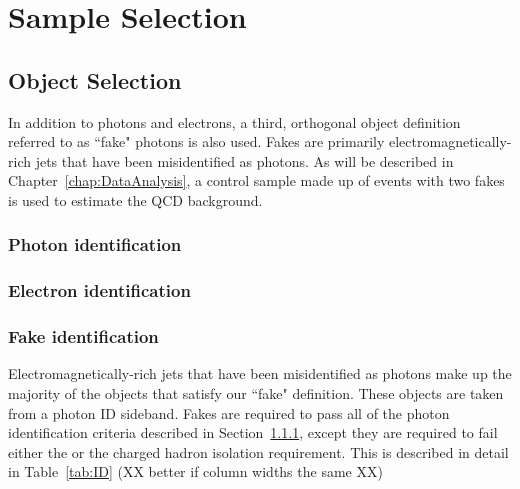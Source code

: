 \chapter{Sample Selection}
\label{chap:EventSelect}

\section{Object Selection}
\label{sec:ObjSelect}
In addition to photons and electrons, a third, orthogonal object definition referred to as ``fake" photons is also used. 
Fakes are primarily electromagnetically-rich jets that have been misidentified as photons. As will be described in Chapter~\ref{chap:DataAnalysis},
a control sample made up of events with two fakes is used to estimate the QCD background. 

\subsection{Photon identification}
\label{sec:phoID}

\subsection{Electron identification}
\label{sec:eleID}


\subsection{Fake identification}
\label{sec:fakeID}
Electromagnetically-rich jets that have been misidentified as photons make up the majority of the objects 
that satisfy our ``fake" definition. These objects are taken from a photon ID sideband. Fakes are required to 
pass all of the photon identification criteria described in Section~\ref{sec:phoID}, except they are required to
fail either the \sigmaietaieta or the charged hadron isolation requirement. This is described in detail in Table~\ref{tab:ID}
(XX better if column widths the same XX)


